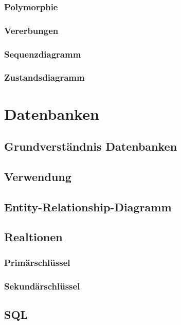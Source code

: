 \documentclass[12pt,a4paper]{article}
\begin{document}
\subsubsection{Polymorphie}

\subsubsection{Vererbungen}

\subsubsection{Sequenzdiagramm}

\subsubsection{Zustandsdiagramm}

\section{Datenbanken}

\subsection{Grundverständnis Datenbanken}

\subsection{Verwendung}

\subsection{Entity-Relationship-Diagramm}

\subsection{Realtionen}
    
\subsubsection{Primärschlüssel}
    
\subsubsection{Sekundärschlüssel}

\subsection{SQL}
    
\end{document}
